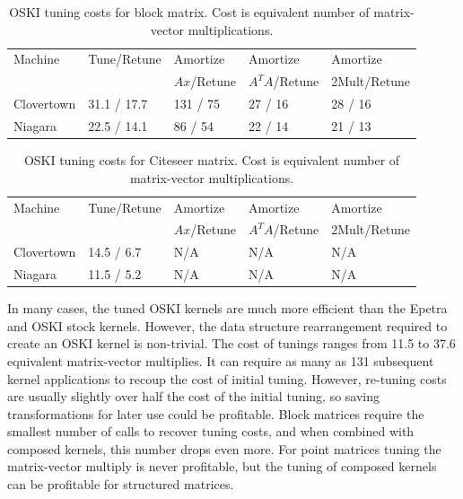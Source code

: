 \begin{table}[htbp]
\begin{center}
\begin{tabular}{|l|l|l|l|l|}
\hline
Machine & Tune/Retune & Amortize & Amortize & Amortize \\
 & & $Ax$/Retune & $A^TA$/Retune & 2Mult/Retune \\
\hline
Clovertown & 31.1 / 17.7 & 131 / 75  & 27 / 16 &  28 / 16  \\
Niagara & 22.5 / 14.1 & 86 / 54 & 22 / 14  & 21 / 13 \\
\hline
\end{tabular}
\caption{OSKI tuning costs for block matrix. Cost is equivalent number of matrix-vector multiplications.}
\label{IK:fig:tuningcostsblock}
\end{center}
\end{table}


\begin{table}[htbp]
\begin{center}
\begin{tabular}{|l|l|l|l|l|}
\hline
Machine & Tune/Retune & Amortize & Amortize & Amortize \\
 & & $Ax$/Retune & $A^TA$/Retune & 2Mult/Retune \\
\hline
Clovertown & 14.5 / 6.7 & N/A & N/A & N/A \\
Niagara & 11.5 / 5.2 & N/A & N/A & N/A \\
\hline
\end{tabular}
\caption{OSKI tuning costs for Citeseer matrix. Cost is equivalent number of matrix-vector multiplications.}
\label{IK:fig:tuningcostsciteseer}
\end{center}
\end{table}

In many cases, the tuned OSKI kernels are much more efficient than the Epetra and
OSKI stock kernels.
However, the data structure rearrangement required to create an OSKI
kernel is non-trivial. The cost of tunings ranges from 11.5 to 37.6 equivalent matrix-vector multiplies.
It can require as many as 131 subsequent kernel applications to recoup the cost of initial tuning.
However, re-tuning costs are usually slightly over half the cost
of the initial tuning, so saving transformations for later use could be profitable.  Block
matrices require the smallest number of calls to recover tuning costs, and when combined with
composed kernels, this number drops even more.
For point matrices tuning the matrix-vector
multiply is never profitable, but the tuning of composed kernels can be profitable
for structured matrices.


